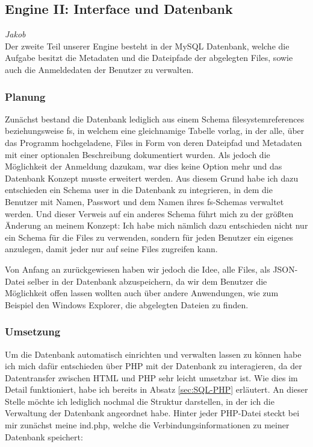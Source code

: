 \documentclass[12pt,a4paper,bibliography=totocnumbered,listof=totocnumbered]{scrartcl}
\begin{document}
\begin{minipage}{\linewidth}
\subsection{Engine II: Interface und Datenbank}
\emph{Jakob}\\
\label{sec:EngineII}
Der zweite Teil unserer Engine besteht in der MySQL Datenbank, welche die Aufgabe besitzt die Metadaten und die Dateipfade der abgelegten Files, sowie auch die Anmeldedaten der Benutzer zu verwalten.

\subsubsection{Planung}
\label{sec:EngineIIPlanung}
Zunächst bestand die Datenbank lediglich aus einem Schema \glqq filesystemreferences\grqq{} beziehungsweise \glqq fs\grqq{}, in welchem eine gleichnamige Tabelle vorlag, in der alle, über das Programm hochgeladene, Files in Form von deren Dateipfad und Metadaten mit einer optionalen Beschreibung dokumentiert wurden.
Als jedoch die Möglichkeit der Anmeldung dazukam, war dies keine Option mehr und das Datenbank Konzept musste erweitert werden.
Aus diesem Grund habe ich dazu entschieden ein Schema \glqq user\grqq{} in die Datenbank zu integrieren, in dem die Benutzer mit Namen, Passwort und dem Namen ihres \glqq fs-Schemas\grqq{} verwaltet werden.
Und dieser Verweis auf ein anderes Schema führt mich zu der größten Änderung an meinem Konzept:
Ich habe mich nämlich dazu entschieden nicht nur ein Schema für die Files zu verwenden, sondern für jeden Benutzer ein eigenes anzulegen, damit jeder nur auf seine Files zugreifen kann.

Von Anfang an zurückgewiesen haben wir jedoch die Idee, alle Files, als JSON-Datei selber in der Datenbank abzuspeichern, da wir dem Benutzer die Möglichkeit offen lassen wollten auch über andere Anwendungen, wie zum Beispiel den Windows Explorer, die abgelegten Dateien zu finden.

\subsubsection{Umsetzung}
Um die Datenbank automatisch einrichten und verwalten lassen zu können habe ich mich dafür entschieden über PHP mit der Datenbank zu interagieren, da der Datentransfer zwischen HTML und PHP sehr leicht umsetzbar ist.
Wie dies im Detail funktioniert, habe ich bereits in Absatz \ref{sec:SQL-PHP} erläutert.
An dieser Stelle möchte ich lediglich nochmal die Struktur darstellen, in der ich die Verwaltung der Datenbank angeordnet habe.
Hinter jeder PHP-Datei steckt bei mir zunächst meine \glqq ind.php\grqq, welche die Verbindungsinformationen zu meiner Datenbank speichert:


\end{minipage}
\end{document}
